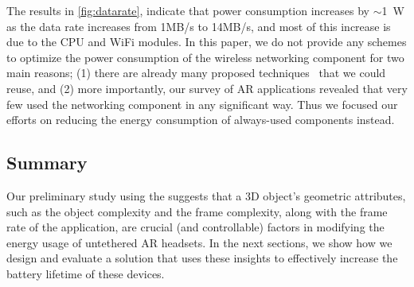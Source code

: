 The results in \fig\ref{fig:datarate}, indicate that power consumption increases by $\sim$1~W as the data rate increases from 1MB/s to 14MB/s, and most of this increase is due to the CPU and WiFi modules. In this paper, we do not provide any schemes to optimize the power consumption of the wireless networking component for two main reasons; (1) there are already many proposed techniques~\cite{Qian2018, Qian2018TVP, Abari2017, Corbillon7996611} that we could reuse, and (2) more importantly, our survey of AR applications revealed that very few used the networking component in any significant way. Thus we focused our efforts on reducing the energy consumption of always-used components instead.




\subsection{Summary}
%
Our preliminary study using the {\mlo} suggests that a 3D object's 
geometric attributes, such as the object complexity and the frame complexity, 
along with the frame rate of the application, are crucial (and controllable) factors in modifying the energy usage of untethered AR headsets. In the next sections, we show how we design and evaluate a solution that uses these insights to effectively increase the battery lifetime of these devices.




    
